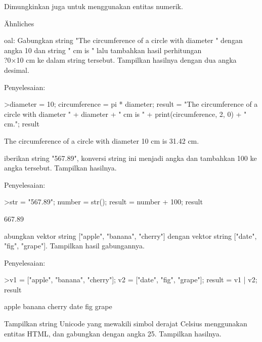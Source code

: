 \documentclass{article}
\begin{document}
\begin{eulernotebook}
\begin{eulercomment}
\begin{eulercomment}
\begin{eulercomment}
Dimungkinkan juga untuk menggunakan entitas numerik.
\end{eulercomment}
\begin{euleroutput}
  Ähnliches
\end{euleroutput}
\eulersubheading{}
\begin{eulercomment}
oal: Gabungkan string "The circumference of a circle with diameter "
dengan angka 10 dan string " cm is " lalu tambahkan hasil perhitungan\\
?0×10 cm ke dalam string tersebut. Tampilkan hasilnya dengan dua angka
desimal.

Penyelesaian:
\end{eulercomment}
\begin{eulerprompt}
>diameter = 10; circumference = pi * diameter; result = "The circumference of a circle with diameter " + diameter + " cm is " + print(circumference, 2, 0) + " cm."; result
\end{eulerprompt}
\begin{euleroutput}
  The circumference of a circle with diameter 10 cm is 31.42 cm.
\end{euleroutput}
\begin{eulercomment}
iberikan string "567.89", konversi string ini menjadi angka dan
tambahkan 100 ke angka tersebut. Tampilkan hasilnya.

Penyelesaian:
\end{eulercomment}
\begin{eulerprompt}
>str = "567.89"; number = str(); result = number + 100; result
\end{eulerprompt}
\begin{euleroutput}
  667.89
\end{euleroutput}
\begin{eulercomment}
abungkan vektor string ["apple", "banana", "cherry"] dengan vektor
string ["date", "fig", "grape"]. Tampilkan hasil gabungannya.

Penyelesaian:
\end{eulercomment}
\begin{eulerprompt}
>v1 = ["apple", "banana", "cherry"]; v2 = ["date", "fig", "grape"]; result = v1 | v2; result
\end{eulerprompt}
\begin{euleroutput}
  apple
  banana
  cherry
  date
  fig
  grape
\end{euleroutput}
\begin{eulercomment}
Tampilkan string Unicode yang mewakili simbol derajat Celsius
menggunakan entitas HTML, dan gabungkan dengan angka 25. Tampilkan
hasilnya.


\end{eulercomment}
\end{eulercomment}
\end{eulercomment}
\end{eulernotebook}
\end{document}
